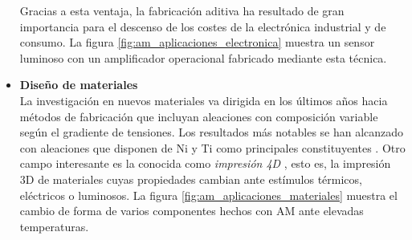 \begin{itemize}
    Gracias a esta ventaja, la fabricación aditiva ha resultado de gran importancia para el descenso de los costes de la electrónica industrial y de consumo. La figura \ref{fig:am_aplicaciones_electronica} muestra un sensor luminoso con un amplificador operacional fabricado mediante esta técnica.

    \item \textbf{Diseño de materiales}\\
    La investigación en nuevos materiales va dirigida en los últimos años hacia métodos de fabricación que incluyan aleaciones con composición variable según el gradiente de tensiones. Los resultados más notables se han alcanzado con aleaciones que disponen de Ni y  Ti como principales constituyentes \cite{Li2019}. Otro campo interesante es la conocida como \textit{impresión 4D} \cite{Mahmood2023}, esto es, la impresión 3D de materiales cuyas propiedades cambian ante estímulos térmicos, eléctricos o luminosos. La figura \ref{fig:am_aplicaciones_materiales} muestra el cambio de forma de varios componentes hechos con AM ante elevadas temperaturas.


\end{itemize}
